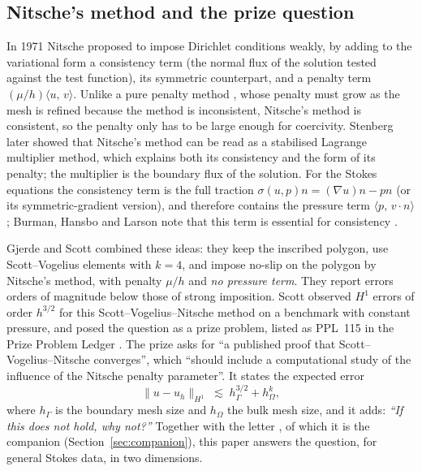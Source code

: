 \documentclass[pdflatex,sn-mathphys-num]{sn-jnl}
\theoremstyle{thmstyleone}
\theoremstyle{thmstylethree}
\newcommand{\hG}{h_\Gamma}
\newcommand{\hO}{h_\Omega}
\newcommand{\ip}[2]{\langle #1,\, #2\rangle}
\newcommand{\norm}[1]{\lVert #1\rVert}
\begin{document}
\subsection{Nitsche's method and the prize question}
In 1971 Nitsche \cite{Nitsche1971} proposed to impose Dirichlet conditions weakly, by adding to the variational form a consistency term (the normal flux of the solution tested against the test function), its symmetric counterpart, and a penalty term $(\mu/h)\ip{u}{v}$. Unlike a pure penalty method \cite{Babuska1973}, whose penalty must grow as the mesh is refined because the method is inconsistent, Nitsche's method is consistent, so the penalty only has to be large enough for coercivity. Stenberg \cite{Stenberg1995} later showed that Nitsche's method can be read as a stabilised Lagrange multiplier method, which explains both its consistency and the form of its penalty; the multiplier is the boundary flux of the solution. For the Stokes equations the consistency term is the full traction $\sigma(u,p)n=(\nabla u)n-pn$ (or its symmetric-gradient version), and therefore contains the pressure term $\ip{p}{v\cdot n}$ \cite{FreundStenberg1995,Stenberg1995,Becker2002,BurmanHansbo2014}; Burman, Hansbo and Larson note that this term is essential for consistency \cite{BurmanHansboLarson2019Stokes}.

Gjerde and Scott \cite{GjerdeScott2024} combined these ideas: they keep the inscribed polygon, use Scott--Vogelius elements with $k=4$, and impose no-slip on the polygon by Nitsche's method, with penalty $\mu/h$ and \emph{no pressure term}. They report errors orders of magnitude below those of strong imposition. Scott observed $H^1$ errors of order $h^{3/2}$ for this Scott--Vogelius--Nitsche method on a benchmark with constant pressure, and posed the question as a prize problem, listed as PPL~115 in the Prize Problem Ledger \cite{ScottPrize}. The prize asks for ``a published proof that Scott--Vogelius--Nitsche converges'', which ``should include a computational study of the influence of the Nitsche penalty parameter''. It states the expected error
\[
\norm{u-u_h}_{H^1}\;\lesssim\;\hG^{3/2}+\hO^k,
\]
where $\hG$ is the boundary mesh size and $\hO$ the bulk mesh size, and it adds: \emph{``If this does not hold, why not?''} Together with the letter \cite{CavalcantePadhiLetter}, of which it is the companion (Section~\ref{sec:companion}), this paper answers the question, for general Stokes data, in two dimensions.
\end{document}
